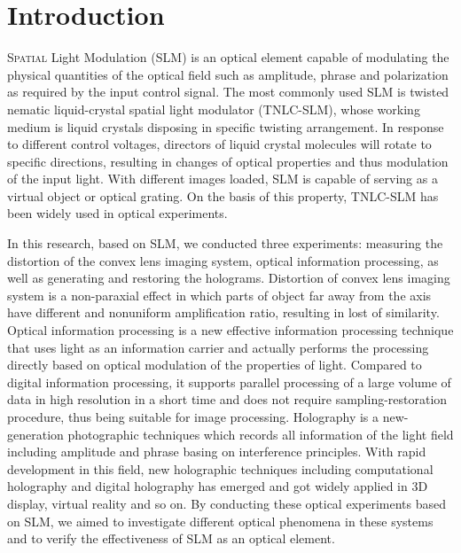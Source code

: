 \documentclass[10pt,a4paper,twocolumn,twoside,UTF8]{article}
\begin{document}
\renewcommand{\thefootnote}{\fnsymbol{footnote}}

\thispagestyle{firstpage} 
\pagestyle{maincontent}

\section{Introduction}
\lettrine[lines=2]{S}{patial} Light Modulation (SLM) is an optical element capable of modulating the physical quantities of the optical field such as amplitude, phrase and polarization as required by the input control signal.
The most commonly used SLM is twisted nematic liquid-crystal spatial light modulator (TNLC-SLM), whose working medium is liquid crystals disposing in specific twisting arrangement. In response to different control voltages, 
directors of liquid crystal molecules will rotate to specific directions, resulting in changes of optical properties and thus modulation of the input light.
With different images loaded, SLM is capable of serving as a virtual object or optical grating. On the basis of this property, TNLC-SLM has been widely used in optical experiments. 

In this research, based on SLM, we conducted three experiments: measuring the distortion of the convex lens imaging system, optical information processing, as well as generating and restoring the holograms.
Distortion of convex lens imaging system is a non-paraxial effect in which parts of object far away from the axis have different and nonuniform amplification ratio, resulting in lost of similarity.
Optical information processing is a new effective information processing technique that uses light as an information carrier and actually performs the processing directly based on optical modulation of the properties of light. 
Compared to digital information processing, it supports parallel processing of a large volume of data in high resolution in a short time and does not require sampling-restoration procedure, thus being suitable for image processing.
Holography is a new-generation photographic techniques which records all information of the light field including amplitude and phrase basing on interference principles. 
With rapid development in this field, new holographic techniques including computational holography and digital holography has emerged and got widely applied in 3D display, virtual reality and so on.
By conducting these optical experiments based on SLM, we aimed to investigate different optical phenomena in these systems and to verify the effectiveness of SLM as an optical element.
\end{document}
